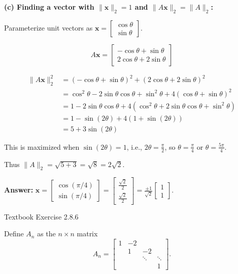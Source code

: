 \documentclass[reqno, answers]{exam}
\begin{document}
\begin{questions}
\begin{solution}
\textbf{(c) Finding a vector with $\|\mathbf{x}\|_2 = 1$ and $\|A\mathbf{x}\|_2 = \|A\|_2$:}

Parameterize unit vectors as $\mathbf{x} = \begin{bmatrix} \cos\theta \\ \sin\theta \end{bmatrix}$.

\[
A\mathbf{x} = \begin{bmatrix} -\cos\theta + \sin\theta \\ 2\cos\theta + 2\sin\theta \end{bmatrix}
\]

\begin{align*}
\|A\mathbf{x}\|_2^2 &= (-\cos\theta + \sin\theta)^2 + (2\cos\theta + 2\sin\theta)^2 \\
&= \cos^2\theta - 2\sin\theta\cos\theta + \sin^2\theta + 4(\cos\theta + \sin\theta)^2 \\
&= 1 - 2\sin\theta\cos\theta + 4(\cos^2\theta + 2\sin\theta\cos\theta + \sin^2\theta) \\
&= 1 - \sin(2\theta) + 4(1 + \sin(2\theta)) \\
&= 5 + 3\sin(2\theta)
\end{align*}

This is maximized when $\sin(2\theta) = 1$, i.e., $2\theta = \frac{\pi}{2}$, so $\theta = \frac{\pi}{4}$ or $\theta = \frac{5\pi}{4}$.

Thus $\|A\|_2 = \sqrt{5 + 3} = \sqrt{8} = 2\sqrt{2}$.

\textbf{Answer:} $\mathbf{x} = \begin{bmatrix} \cos(\pi/4) \\ \sin(\pi/4) \end{bmatrix} = \begin{bmatrix} \frac{\sqrt{2}}{2} \\ \frac{\sqrt{2}}{2} \end{bmatrix} = \frac{\pm 1}{\sqrt{2}}\begin{bmatrix} 1 \\ 1 \end{bmatrix}$.
\end{solution}

\question Textbook Exercise 2.8.6

Define $A_n$ as the $n \times n$ matrix
\[
A_n = \begin{bmatrix} 1 & -2 & & \\ & 1 & -2 & \\ & & \ddots & \ddots \\ & & & 1 \end{bmatrix}.
\]
\begin{parts}

\end{parts}
\end{questions}
\end{document}
